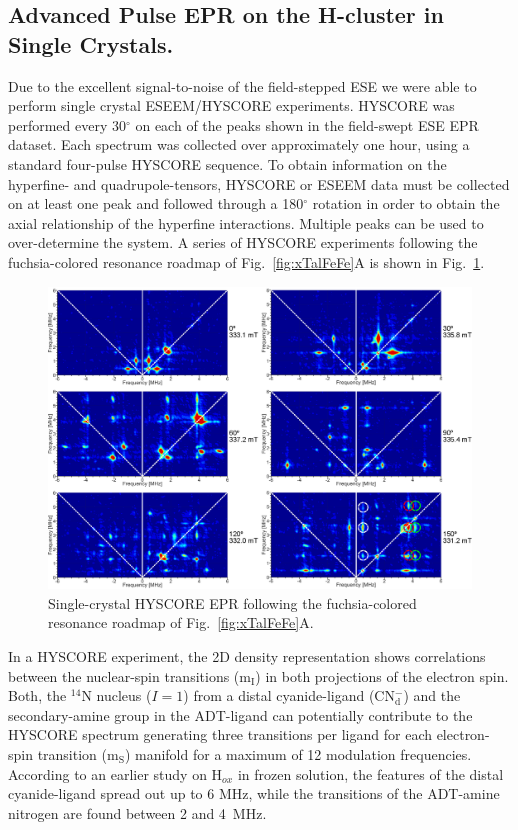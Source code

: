 \subsection{Advanced Pulse EPR on the H-cluster in Single Crystals.}
Due to the excellent signal-to-noise of the field-stepped ESE we were able to perform single crystal ESEEM/HYSCORE experiments. HYSCORE was performed every 30$^{\circ}$ on each of the peaks shown in the field-swept ESE EPR dataset. Each spectrum was collected over approximately one hour, using a standard four-pulse HYSCORE sequence. \cite{schweiger2001principles} To obtain information on the hyperfine- and quadrupole-tensors, HYSCORE or ESEEM data must be collected on at least one peak and followed through a 180$^{\circ}$ rotation in order to obtain the axial relationship of the hyperfine interactions. Multiple peaks can be used to over-determine the system. A series of HYSCORE experiments following the fuchsia-colored resonance roadmap of Fig.~\ref{fig:xTalFeFe}A is shown in Fig.~\ref{fig:FeFeHYSCOREFollow}. 

\begin{figure}[ht]
\centering
 \includegraphics[width=\textwidth]{Kapitel/Ch5-Images/FeFe-FollowHyscore.eps}
 \caption[Single-crystal HYSCORE EPR following a single peak.]{Single-crystal HYSCORE EPR following the fuchsia-colored resonance roadmap of Fig.~\ref{fig:xTalFeFe}A.} \label{fig:FeFeHYSCOREFollow}
\end{figure}

In a HYSCORE experiment, the 2D density representation shows correlations between the nuclear-spin transitions (m$_\text{I}$) in both projections of the electron spin. Both, the $^{14}$N nucleus ($I=1$) from a distal cyanide-ligand (CN$_\text{d}^-$) and the secondary-amine group in the ADT-ligand can potentially contribute to the HYSCORE spectrum generating three transitions per ligand for each electron-spin transition (m$_\text{S}$) manifold for a maximum of 12 modulation frequencies. According to an earlier study on H$_{ox}$ in frozen solution, the features of the distal cyanide-ligand spread out up to 6 MHz, while the transitions of the ADT-amine nitrogen are found between 2 and 4~MHz. \cite{Adamska2015,Adamska2015pdt}

